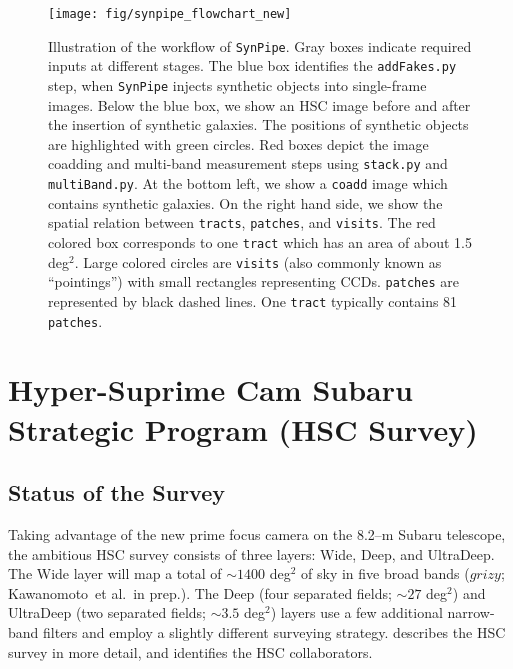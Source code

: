 \documentclass[useamsfonts]{pasj01}
\def\etal{{\ et al.~}}
\def\synpipe{\texttt{SynPipe}}
\def\coadd{\texttt{coadd}}
\def\tract{\texttt{tract}}
\def\visits{\texttt{visits}}
\begin{document}
\begin{figure}
    \begin{center}
        \texttt{[image: fig/synpipe\_flowchart\_new]}
    \end{center}
    \caption{
        Illustration of the workflow of \synpipe{}.
        Gray boxes indicate required inputs at different stages.
        The blue box identifies the \texttt{addFakes.py} step, when \synpipe{} injects 
        synthetic objects into single-frame images. 
        Below the blue box, we show an HSC image before and after the insertion of 
        synthetic galaxies. 
        The positions of synthetic objects are highlighted with green circles. 
        Red boxes depict the image coadding and multi-band measurement steps
        using \texttt{stack.py} and \texttt{multiBand.py}. 
        At the bottom left, we show a \coadd{} image which contains synthetic galaxies. 
        On the right hand side, we show the spatial relation between \texttt{tracts},
        \texttt{patches}, and \visits{}. 
        The red colored box corresponds to one \tract{} which has an area of 
        about 1.5 deg$^2$. 
        Large colored circles are \visits{} (also commonly known as ``pointings'') 
        with small rectangles representing CCDs. 
        \texttt{patches} are represented by black dashed lines. 
        One \tract{} typically contains 81 \texttt{patches}.
        }
    \label{fig:flowchart}
\end{figure}

\section{Hyper-Suprime Cam Subaru Strategic Program (HSC Survey)}
    \label{sec:ssp}

\subsection{Status of the Survey}
    \label{ssec:ssp}
    
    Taking advantage of the new prime focus camera on the 8.2--m Subaru telescope,
    the ambitious HSC survey consists of three layers: Wide, Deep, and UltraDeep.
    The Wide layer will map a total of ${\sim}1400$ deg$^2$ of sky in five broad bands
    ($grizy$; Kawanomoto\etal in prep.).
    The Deep (four separated fields; ${\sim}27$ deg$^2$) and UltraDeep (two separated
    fields; ${\sim}3.5$ deg$^2$) layers use a few additional narrow-band filters
    and employ a slightly different surveying strategy.
    \citet{HSCOverview} describes the HSC survey in more detail, and identifies the
    HSC collaborators.
\end{document}
